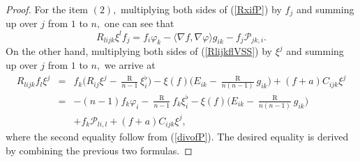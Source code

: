 \documentclass[10pt,leqno,oneside]{amsart}
\begin{document}
{\begin{proof}
       For the item $(2),$ multiplying both sides of (\ref{RxifP}) by $f_j$ and summing up over $j$ from $1$ to $n,$ one can see that
       \begin{equation*}
             R_{lijk}\xi^lf_j=f_i\varphi_k-\langle\nabla f,\nabla\varphi\rangle g_{ik}-f_j\mathcal{P}_{jk,i}.
       \end{equation*}
       On the other hand, multiplying both sides of (\ref{RlijkflVSS}) by $\xi^j$ and summing up over $j$ from $1$ to $n,$ we arrive at
       \begin{eqnarray*}
       R_{lijk}f_{l}\xi^j&=&f_{k}\big(R_{ij}\xi^j-\frac{\operatorname R}{n-1}\xi_i^{\flat}\big)-\xi(f)\big(E_{ik}-\frac{\operatorname R}{n(n-1)}g_{ik}\big)+(f+a)C_{ijk}\xi^j \\
          &=& -(n-1)f_k\varphi_i-\frac{\operatorname R}{n-1}f_k\xi_i^{\flat}-\xi(f)\big(E_{ik}-\frac{\operatorname R}{n(n-1)}g_{ik}\big)\\
          &&+f_k\mathcal{P}_{li,l}+(f+a)C_{ijk}\xi^j,
       \end{eqnarray*}
       where the second equality follow from (\ref{divofP}). The desired equality is derived by combining the previous two formulas.
    \end{proof}

}
\end{document}

